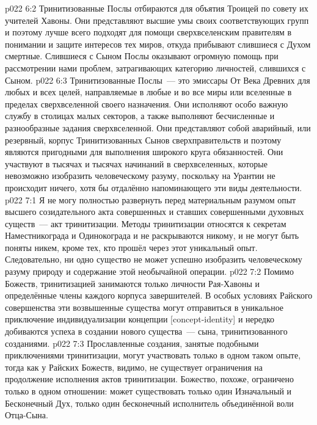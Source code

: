 \vs p022 6:2 Тринитизованные Послы отбираются для объятия Троицей по совету их учителей Хавоны. Они представляют высшие умы своих соответствующих групп и поэтому лучше всего подходят для помощи сверхвселенским правителям в понимании и защите интересов тех миров, откуда прибывают слившиеся с Духом смертные. Слившиеся с Сыном Послы оказывают огромную помощь при рассмотрении нами проблем, затрагивающих категорию личностей, слившихся с Сыном.
\vs p022 6:3 Тринитизованные Послы~--- это эмиссары От Века Древних для любых и всех целей, направляемые в любые и во все миры или вселенные в пределах сверхвселенной своего назначения. Они исполняют особо важную службу в столицах малых секторов, а также выполняют бесчисленные и разнообразные задания сверхвселенной. Они представляют собой аварийный, или резервный, корпус Тринитизованных Сынов сверхправительств и поэтому являются пригодными для выполнения широкого круга обязанностей. Они участвуют в тысячах и тысячах начинаний в сверхвселенных, которые невозможно изобразить человеческому разуму, поскольку на Урантии не происходит ничего, хотя бы отдалённо напоминающего эти виды деятельности.
\vs p022 7:1 Я не могу полностью развернуть перед материальным разумом опыт высшего созидательного акта совершенных и ставших совершенными духовных существ~--- акт тринитизации. Методы тринитизации относятся к секретам Наместникограда и Одинокограда и не раскрываются никому, и не могут быть поняты никем, кроме тех, кто прошёл через этот уникальный опыт. Следовательно, ни одно существо не может успешно изобразить человеческому разуму природу и содержание этой необычайной операции.
\vs p022 7:2 Помимо Божеств, тринитизацией занимаются только личности Рая\hyp{}Хавоны и определённые члены каждого корпуса завершителей. В особых условиях Райского совершенства эти возвышенные существа могут отправиться в уникальное приключение индивидуализации концепции [concept\hyp{}identity] и нередко добиваются успеха в создании нового существа~--- сына, тринитизованного созданиями.
\vs p022 7:3 Прославленные создания, занятые подобными приключениями тринитизации, могут участвовать только в одном таком опыте, тогда как у Райских Божеств, видимо, не существует ограничения на продолжение исполнения актов тринитизации. Божество, похоже, ограничено только в одном отношении: может существовать только один Изначальный и Бесконечный Дух, только один бесконечный исполнитель объединённой воли Отца\hyp{}Сына.
